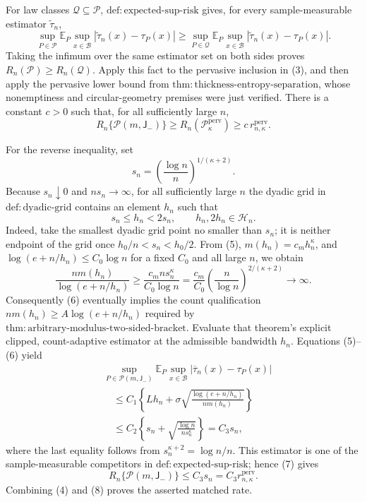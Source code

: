 For law classes \(\mathcal Q\subseteq\mathcal P\), \(\mathrm{def:expected\text{-}sup\text{-}risk}\) gives, for every sample-measurable estimator \(\widetilde\tau_n\),
\[
 \sup_{P\in\mathcal P}
 \mathbb E_P\sup_{x\in\mathcal B}
 |\widetilde\tau_n(x)-\tau_P(x)|
 \ge
 \sup_{P\in\mathcal Q}
 \mathbb E_P\sup_{x\in\mathcal B}
 |\widetilde\tau_n(x)-\tau_P(x)|.
\]
Taking the infimum over the same estimator set on both sides proves \(R_n(\mathcal P)\ge R_n(\mathcal Q)\).  Apply this fact to the pervasive inclusion in (3), and then apply the pervasive lower bound from \(\mathrm{thm:thickness\text{-}entropy\text{-}separation}\), whose nonemptiness and circular-geometry premises were just verified.  There is a constant \(c>0\) such that, for all sufficiently large \(n\),
\[
 R_n\{\mathcal P(m,\mathsf J_-)\}
 \ge R_n(\mathcal P_\kappa^{\mathrm{perv}})
 \ge c\,r_{n,\kappa}^{\mathrm{perv}}. \tag{4}
\]

For the reverse inequality, set
\[
 s_n=\left(\frac{\log n}{n}\right)^{1/(\kappa+2)}.
\]
Because \(s_n\downarrow0\) and \(ns_n\to\infty\), for all sufficiently large \(n\) the dyadic grid in \(\mathrm{def:dyadic\text{-}grid}\) contains an element \(h_n\) such that
\[
 s_n\le h_n<2s_n,
 \qquad h_n,2h_n\in\mathcal H_n. \tag{5}
\]
Indeed, take the smallest dyadic grid point no smaller than \(s_n\); it is neither endpoint of the grid once \(h_0/n<s_n<h_0/2\).  From (5), \(m(h_n)=c_mh_n^\kappa\), and \(\log(e+n/h_n)\le C_0\log n\) for a fixed \(C_0\) and all large \(n\), we obtain
\[
 \frac{nm(h_n)}{\log(e+n/h_n)}
 \ge \frac{c_mns_n^\kappa}{C_0\log n}
 =\frac{c_m}{C_0}
 \left(\frac n{\log n}\right)^{2/(\kappa+2)}
 \longrightarrow\infty. \tag{6}
\]
Consequently (6) eventually implies the count qualification \(nm(h_n)\ge A\log(e+n/h_n)\) required by \(\mathrm{thm:arbitrary\text{-}modulus\text{-}two\text{-}sided\text{-}bracket}\).  Evaluate that theorem's explicit clipped, count-adaptive estimator at the admissible bandwidth \(h_n\).  Equations (5)--(6) yield
\[
\begin{aligned}
 &\sup_{P\in\mathcal P(m,\mathsf J_-)}
 \mathbb E_P\sup_{x\in\mathcal B}
 |\overline\tau_n(x)-\tau_P(x)| \\
 &\quad\le
 C_1\left\{Lh_n+
 \sigma\sqrt{\frac{\log(e+n/h_n)}{nm(h_n)}}\right\} \\
 &\quad\le C_2\left\{s_n+
 \sqrt{\frac{\log n}{ns_n^\kappa}}\right\}
 =C_3s_n, \tag{7}
\end{aligned}
\]
where the last equality follows from \(s_n^{\kappa+2}=\log n/n\).  This estimator is one of the sample-measurable competitors in \(\mathrm{def:expected\text{-}sup\text{-}risk}\); hence (7) gives
\[
 R_n\{\mathcal P(m,\mathsf J_-)\}
 \le C_3s_n
 =C_3r_{n,\kappa}^{\mathrm{perv}}. \tag{8}
\]
Combining (4) and (8) proves the asserted matched rate.

